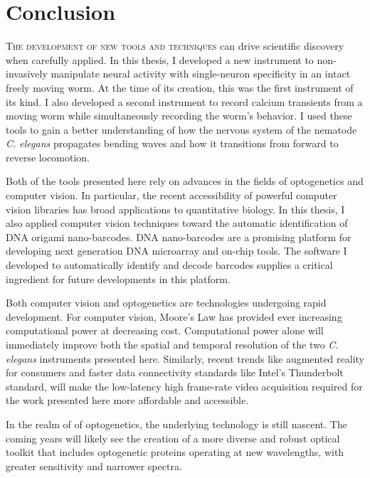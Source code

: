 
\chapter{Conclusion}\label{chapter:conclusion}
\lettrine{T}{he development of new tools and techniques} can drive scientific discovery when carefully applied. In this thesis, I developed a new instrument to non-invasively manipulate neural activity with single-neuron specificity  in an intact freely moving worm. At the time of its creation, this was the first instrument of its kind. I also developed a second instrument to record calcium transients from a moving worm while simultaneously recording the worm's behavior. I used these tools to gain  a better understanding of how the nervous system of the nematode \textit{C. elegans} propagates bending waves and how it transitions from forward to reverse locomotion.

Both of the tools presented here  rely on advances in the fields of optogenetics and computer vision. In particular, the recent accessibility of powerful computer vision libraries  has broad applications to quantitative biology. In this thesis, I also applied computer vision techniques toward the automatic identification of  DNA origami nano-barcodes. DNA nano-barcodes are a promising platform for developing next generation DNA microarray and on-chip tools.  The software I developed to automatically identify and decode barcodes supplies a critical ingredient for future developments in this platform. 

Both  computer vision and optogenetics are technologies undergoing rapid development.
For computer vision, Moore's Law has provided ever increasing computational power at decreasing cost. Computational power alone will immediately improve both the spatial and temporal resolution of the two \textit{C. elegans} instruments presented here. Similarly, recent trends like augmented reality for consumers and faster data connectivity standards like Intel's Thunderbolt standard, will make the low-latency high frame-rate video acquisition  required for the work presented here more affordable and accessible.


In the realm of of optogenetics, the underlying technology is still nascent. The coming years will likely see the creation of a more diverse and robust optical toolkit that includes optogenetic proteins operating at new wavelengths, with greater sensitivity and narrower spectra.  


